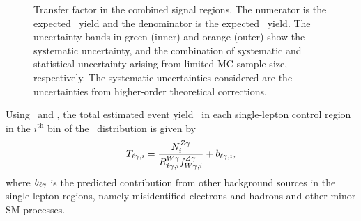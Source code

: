 \begin{figure}[htbp]
  \centering
  \caption{
    Transfer factor \fZW in the combined signal regions.
    The numerator is the expected \zinvg\ yield and the denominator is the expected \wlng\ yield.
    The uncertainty bands in green (inner) and orange (outer) show the systematic uncertainty, and the combination of systematic and statistical uncertainty arising from limited MC sample size, respectively. 
    The systematic uncertainties considered are the uncertainties from higher-order theoretical corrections.
  }
  \label{fig:tf_wz}
\end{figure}

Using \RWl\ and \fZW, the total estimated event yield \Tl\ in each single-lepton control region in the $i^\mathrm{th}$ bin of the \ETg\ distribution is given by
\begin{equation}
  \Tl[,i] = \frac{\NZg[i]}{\RWl[,i]\fZW[,i]} + b_{\ell\Pgg,i},
\end{equation}
where $b_{\ell\Pgg}$ is the predicted contribution from other background sources in the single-lepton regions, namely misidentified electrons and hadrons and other minor SM processes.
